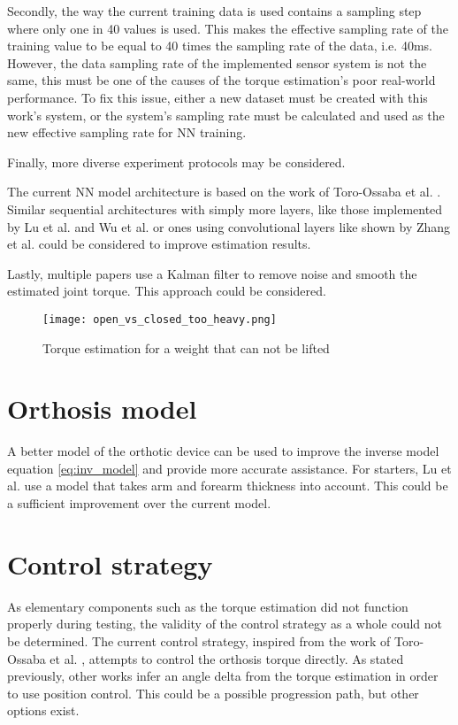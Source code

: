 Secondly, the way the current training data is used contains a sampling step 
where only one in 40 values is used. This makes the effective sampling rate 
of the training value to be equal to 40 times the sampling rate of the data, 
i.e. 40ms. However, the data sampling rate of the implemented sensor system is not 
the same, this must be one of the causes of the torque estimation's poor 
real-world performance. To fix this issue, either a new dataset must be created 
with this work's system, or the system's sampling rate must be calculated and 
used as the new effective sampling rate for NN training.  

Finally, more diverse experiment protocols may be considered.  

\bigskip

The current NN model architecture is based on the work of Toro-Ossaba et al. 
\cite{toro-ossaba_myoelectric_2024}. Similar sequential architectures with 
simply more layers, like those implemented by Lu et al. and Wu et al. 
\cite{lu_development_2019, wu_neural-network-enhanced_2019, wu_adaptive_2023} 
or ones using convolutional layers like shown by Zhang et al. 
\cite{zhang_physics-informed_2023} could be considered to improve estimation 
results. 

\bigskip

Lastly, multiple papers \cite{lu_development_2019, wu_neural-network-enhanced_2019, 
toro-ossaba_myoelectric_2024} use a Kalman filter to remove noise and smooth the 
estimated joint torque. This approach could be considered. 

\begin{figure}[htbp]
  \centering
  \texttt{[image: open\_vs\_closed\_too\_heavy.png]}
  \caption{Torque estimation for a weight that can not be lifted}
  \label{fig:ovctoo_heavy}
\end{figure}

\FloatBarrier
\section{Orthosis model}
A better model of the orthotic device can be used to improve the inverse model equation 
\eqref{eq:inv_model} and provide more accurate assistance. For starters, Lu et al. 
\cite{lu_development_2019} use a model that takes arm and forearm thickness into account. 
This could be a sufficient improvement over the current model. 

\FloatBarrier
\section{Control strategy}
As elementary components such as the torque estimation did not function properly 
during testing, the validity of the control strategy as a whole could not be 
determined. 
The current control strategy, inspired from the work of Toro-Ossaba et al. 
\cite{toro-ossaba_myoelectric_2024}, attempts to control the orthosis torque 
directly. As stated previously, other works \cite{lu_development_2019, 
wu_neural-network-enhanced_2019, wu_adaptive_2023} infer an angle delta from 
the torque estimation in order to use position control. This could be a possible 
progression path, but other options exist.  

